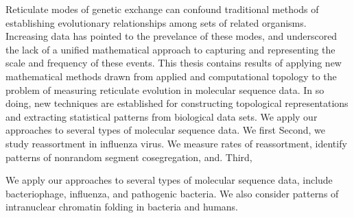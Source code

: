 Reticulate modes of genetic exchange can confound traditional methods of establishing evolutionary relationships among sets of related organisms.
Increasing data has pointed to the prevelance of these modes, and underscored the lack of a unified mathematical approach to capturing and representing the scale and frequency of these events.
This thesis contains results of applying new mathematical methods drawn from applied and computational topology to the problem of measuring reticulate evolution in molecular sequence data.
In so doing, new techniques are established for constructing topological representations and extracting statistical patterns from biological data sets.
We apply our approaches to several types of molecular sequence data.
We first 
Second, we study reassortment in influenza virus.
We measure rates of reassortment, identify patterns of nonrandom segment cosegregation, and.
Third,


We apply our approaches to several types of molecular sequence data, include bacteriophage, influenza, and pathogenic bacteria.
We also consider patterns of intranuclear chromatin folding in bacteria and humans.